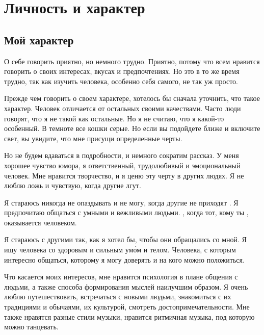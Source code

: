 \chapter{Личность и характер}

\section{Мой характер}
О себе говорить приятно, но немного трудно. Приятно, потому что всем нравится говорить о своих интересах, вкусах и предпочтениях. Но это в то же время трудно, так как изучить человека, особенно себя самого, не так уж просто.

Прежде чем говорить о своем характере, хотелось бы сначала уточнить, что такое характер. Человек отличается от остальных своими качествами. Часто люди говорят, что я не такой как остальные. Но я не считаю, что я какой-то особенный. В темноте все кошки серые. Но если вы подойдете ближе и включите свет, вы увидите, что мне присущи определенные черты.

Но не будем вдаваться в подробности, и немного сократим рассказ. У меня хорошее чувство юмора, я ответственный, трудолюбивый и эмоциональный человек. Мне нравится творчество, и я ценю эту черту в других людях. Я не люблю ложь и чувствую, когда другие лгут.

Я стараюсь никогда не опаздывать и  не могу, когда другие не приходят . Я предпочитаю общаться с умными и вежливыми людьми. , когда тот, кому ты , оказывается  человеком.

Я стараюсь  с другими так, как я хотел бы, чтобы они обращались со мной. Я ищу человека со здоровым и сильным ум\'{о}м и телом. Человека, с которым интересно общаться, которому я могу доверять и на кого можно положиться.

Что касается моих интересов, мне нравится психология в плане общения с людьми, а также способа формирования мыслей наилучшим образом. Я очень люблю путешествовать, встречаться с новыми людьми, знакомиться с их традициями и обычаями, их культурой, смотреть достопримечательности. Мне также нравятся разные стили музыки, нравится ритмичная музыка, под которую можно танцевать.
